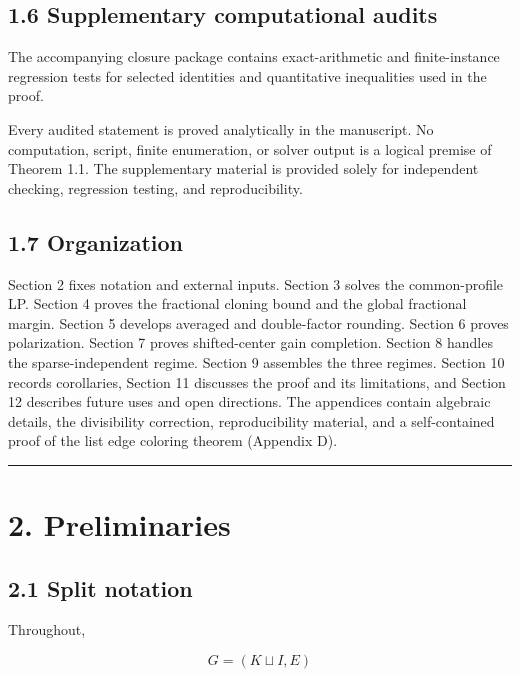 \documentclass[
  11pt,
]{article}
\begin{document}
\subsection{1.6 Supplementary computational audits}\label{supplementary-computational-audits}

The accompanying closure package contains exact-arithmetic and finite-instance regression tests for selected identities and quantitative inequalities used in the proof.

Every audited statement is proved analytically in the manuscript. No computation, script, finite enumeration, or solver output is a logical premise of Theorem 1.1. The supplementary material is provided solely for independent checking, regression testing, and reproducibility.

\subsection{1.7 Organization}\label{organization}

Section 2 fixes notation and external inputs. Section 3 solves the common-profile LP. Section 4 proves the fractional cloning bound and the global fractional margin. Section 5 develops averaged and double-factor rounding. Section 6 proves polarization. Section 7 proves shifted-center gain completion. Section 8 handles the sparse-independent regime. Section 9 assembles the three regimes. Section 10 records corollaries, Section 11 discusses the proof and its limitations, and Section 12 describes future uses and open directions. The appendices contain algebraic details, the divisibility correction, reproducibility material, and a self-contained proof of the list edge coloring theorem (Appendix D).

\begin{center}\rule{0.5\linewidth}{0.5pt}\end{center}

\section{2. Preliminaries}\label{preliminaries}

\subsection{2.1 Split notation}\label{split-notation}

Throughout,

\[
G=(K\sqcup I,E)
\]
\end{document}

